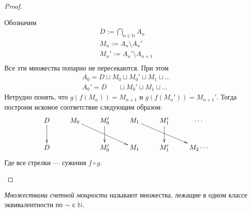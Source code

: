 \begin{proof}
\begin{itemize}
        Обозначим
        \begin{gather*}
            D := \bigcap_{n \in \mathbb{N}}{A_n} \\
            M_n := A_n \setminus A_n' \\
            M_n' := A_n' \setminus A_{n + 1} \\
        \end{gather*}
        Все эти множества попарно не пересекаются. При этом
        \begin{gather*}
            A_0 = D \sqcup M_0 \sqcup M_0' \sqcup M_1 \sqcup \ldots \\
            A_0' = D ~~~~~~~~ \sqcup M_0' \sqcup M_1 \sqcup \ldots
        \end{gather*}
        Нетрудно понять, что $g(f(M_n)) = M_{n+1}$ и $g(f(M_n')) = M_{n+1}'$.
        Тогда построим искомое соответствие следующим образом:
        \begin{displaymath}
            \xymatrix{ D \ar[d] & M_0 \ar[drr] & M_0' \ar[d] & M_1 \ar[drr]
            & M_1' \ar[d] & \cdots \\
                       D & & M_0' & M_1 & M_1' & M_2\cdots }
        \end{displaymath}
        Где все стрелки --- сужения $f \circ g$.
    \end{itemize}
\end{proof}

\begin{definition}
    \textit{Множествами счетной мощности} называют множества, лежащие в одном
    классе эквивалентности по $\sim$ с $\mathbb{N}$.
\end{definition}

